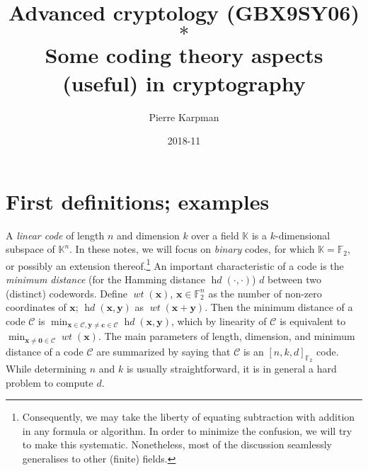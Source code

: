 \documentclass[11pt,a4paper]{article}
\title{Advanced cryptology (GBX9SY06)\\
$\ast$\\
Some coding theory aspects (useful) in cryptography}
\date{2018-11}
\author{Pierre Karpman}
\theoremstyle{definition}
\DeclareMathOperator\hd{\mathit{hd}}
\DeclareMathOperator\wt{\mathit{wt}}
\newcommand\ftwo{\mathbb{F}_{2}}
\newcommand\code{\mathcal{C}}
\begin{document}
\maketitle{}

\section{First definitions; examples}

A \emph{linear code} of length $n$ and dimension $k$ over a field $\mathbb{K}$ is a $k$-dimensional subspace of $\mathbb{K}^n$. In these notes, we will focus on \emph{binary} codes, for which $\mathbb{K} = \mathbb{F}_2$, or possibly an extension thereof.\footnote{Consequently, we may take the liberty of
equating subtraction with addition in any formula or algorithm. In order to minimize the confusion, we will try to make this systematic. Nonetheless, most of the discussion seamlessly generalises to other (finite) fields.}
An important characteristic of a code is the \emph{minimum distance} (for the Hamming distance $\hd(\cdot,\cdot)$) $d$ between two (distinct) codewords. Define $\wt(\bm{x})$, $\bm{x} \in \ftwo^n$ as the number of
non-zero coordinates of $\bm{x}$; $\hd(\bm{x},\bm{y})$ as $\wt(\bm{x}+\bm{y})$. Then the minimum distance of a code $\code$ is $\min_{\bm{x}\in\code,\bm{y}\neq\bm{c}\in\code} \hd(\bm{x},\bm{y})$, which by linearity of $\code$ is equivalent
to $\min_{\bm{x}\neq\bm{0}\in\code} \wt(\bm{x})$. The main parameters of length, dimension, and minimum distance of a code $\code$ are summarized by saying that $\code$ is an $[n,k,d]_{\ftwo}$ code. While determining $n$ and $k$ is usually straightforward,
it is in general a hard problem to compute $d$. 

\smallskip
\end{document}
